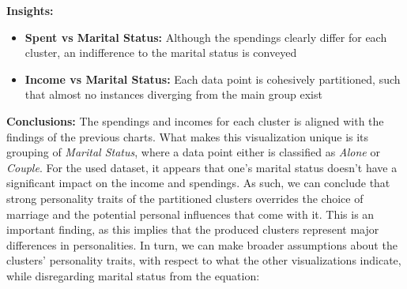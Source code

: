 \documentclass[11pt]{article}
\begin{document}
\textbf{Insights:}

\begin{itemize}
	\item \textbf{Spent vs Marital Status:} Although the spendings clearly differ for each cluster, an indifference to the marital status is conveyed

	\item \textbf{Income vs Marital Status:} Each data point is cohesively partitioned, such that almost no instances diverging from the main group exist

\end{itemize}
\vspace{1\baselineskip}
\textbf{Conclusions:} The spendings and incomes for each cluster is aligned with the findings of the previous charts. What makes this visualization unique is its grouping of \textit{Marital Status}, where a data point either is classified as \textit{Alone} or \textit{Couple}. For the used dataset, it appears that one’s marital status doesn’t have a significant impact on the income and spendings. As such, we can conclude that strong personality traits of the partitioned clusters overrides the choice of marriage and the potential personal influences that come with it. This is an important finding, as this implies that the produced clusters represent major differences in personalities. In turn, we can make broader assumptions about the clusters’ personality traits, with respect to what the other visualizations indicate, while disregarding marital status from the equation:
\end{document}
